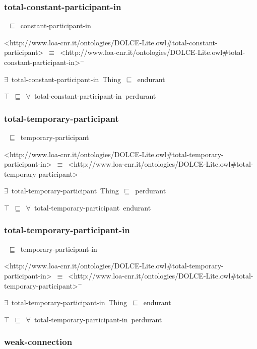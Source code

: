 \documentclass{article}
\begin{document}
\subsubsection*{total-constant-participant-in}

~\ensuremath{\sqsubseteq}~constant-participant-in

<http://www.loa-cnr.it/ontologies/DOLCE-Lite.owl#total-constant-participant>~\ensuremath{\equiv}~<http://www.loa-cnr.it/ontologies/DOLCE-Lite.owl#total-constant-participant-in>\ensuremath{^-}

\ensuremath{\exists}~total-constant-participant-in~Thing~\ensuremath{\sqsubseteq}~endurant

\ensuremath{\top}~\ensuremath{\sqsubseteq}~\ensuremath{\forall}~total-constant-participant-in~perdurant

\subsubsection*{total-temporary-participant}

~\ensuremath{\sqsubseteq}~temporary-participant

<http://www.loa-cnr.it/ontologies/DOLCE-Lite.owl#total-temporary-participant-in>~\ensuremath{\equiv}~<http://www.loa-cnr.it/ontologies/DOLCE-Lite.owl#total-temporary-participant>\ensuremath{^-}

\ensuremath{\exists}~total-temporary-participant~Thing~\ensuremath{\sqsubseteq}~perdurant

\ensuremath{\top}~\ensuremath{\sqsubseteq}~\ensuremath{\forall}~total-temporary-participant~endurant

\subsubsection*{total-temporary-participant-in}

~\ensuremath{\sqsubseteq}~temporary-participant-in

<http://www.loa-cnr.it/ontologies/DOLCE-Lite.owl#total-temporary-participant-in>~\ensuremath{\equiv}~<http://www.loa-cnr.it/ontologies/DOLCE-Lite.owl#total-temporary-participant>\ensuremath{^-}

\ensuremath{\exists}~total-temporary-participant-in~Thing~\ensuremath{\sqsubseteq}~endurant

\ensuremath{\top}~\ensuremath{\sqsubseteq}~\ensuremath{\forall}~total-temporary-participant-in~perdurant

\subsubsection*{weak-connection}
\end{document}
